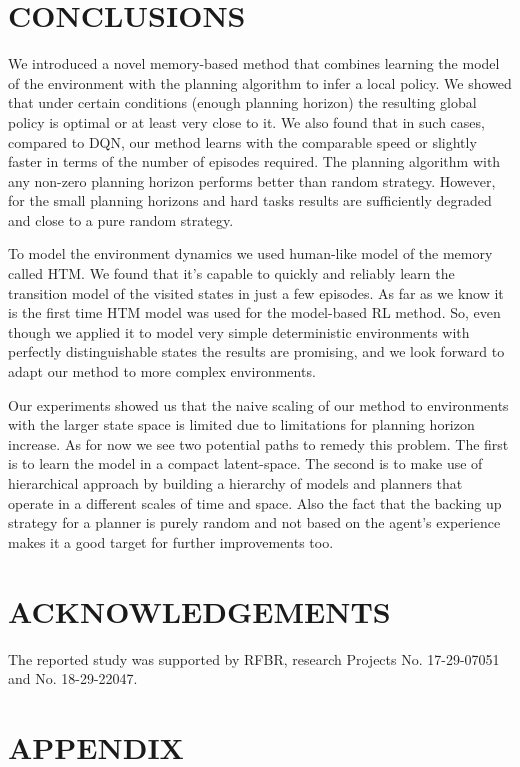 \documentclass[a4paper,twoside]{article}
\begin{document}
\section{\uppercase{Conclusions}}

We introduced a novel memory-based method that combines learning the model of the environment with the planning algorithm to infer a local policy. We showed that under certain conditions (enough planning horizon) the resulting global policy is optimal or at least very close to it. We also found that in such cases, compared to DQN, our method learns with the comparable speed or slightly faster in terms of the number of episodes required. The planning algorithm with any non-zero planning horizon performs better than random strategy. However, for the small planning horizons and hard tasks results are sufficiently degraded and close to a pure random strategy.

To model the environment dynamics we used human-like model of the memory called HTM. We found that it's capable to quickly and reliably learn the transition model of the visited states in just a few episodes. As far as we know it is the first time HTM model was used for the model-based RL method. So, even though we applied it to model very simple deterministic environments with perfectly distinguishable states the results are promising, and we look forward to adapt our method to more complex environments.

Our experiments showed us that the naive scaling of our method to environments with the larger state space is limited due to limitations for planning horizon increase. As for now we see two potential paths to remedy this problem. The first is to learn the model in a compact latent-space. The second is to make use of hierarchical approach by building a hierarchy of models and planners that operate in a different scales of time and space. Also the fact that the backing up strategy for a planner is purely random and not based on the agent's experience makes it a good target for further improvements too.

\section*{\uppercase{Acknowledgements}}
The reported study was supported by RFBR, research Projects No. 17-29-07051 and No. 18-29-22047.

{\small}

\section*{\uppercase{Appendix}}
\end{document}
